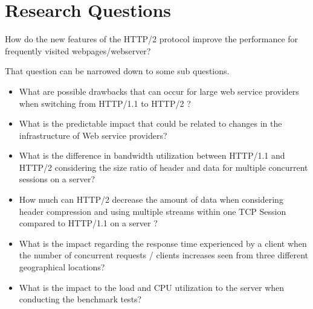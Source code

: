 \section{Research Questions}
\label{chap:rq}

How do the new features of the  HTTP/2 protocol improve the performance for frequently visited webpages/webserver?

That question can be narrowed down to some sub questions.
\begin{itemize}
\item What are possible drawbacks that can occur for large web service providers when switching from HTTP/1.1 to HTTP/2 ?
\item What is the predictable impact that could be related to changes in the infrastructure of Web service providers?
\item What is the difference in bandwidth utilization between HTTP/1.1 and HTTP/2 considering the size ratio of header and data for multiple concurrent sessions on a server?
\item How much can HTTP/2 decrease the amount of data when considering header compression and using multiple streams within one TCP Session compared to HTTP/1.1 on a server ?
\item What is the impact regarding the response time experienced by a client when the number of concurrent requests / clients increases seen from three different geographical locations?
\item What is the impact to the load and CPU utilization to the server when conducting the benchmark tests?
\end{itemize}